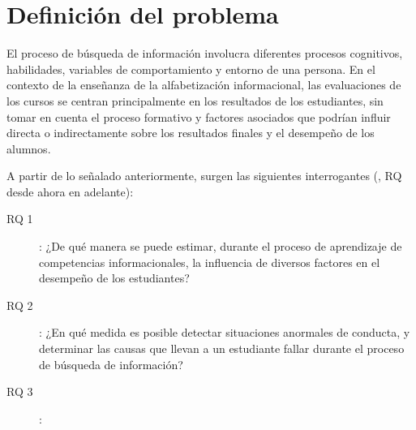 \section{Definición del problema}
\label{sec:definicion_problema}
El proceso de búsqueda de información involucra diferentes procesos cognitivos, habilidades, variables de comportamiento y entorno de una persona. En el contexto de la enseñanza de la alfabetización informacional, las evaluaciones de los cursos se centran principalmente en los resultados de los estudiantes, sin tomar en cuenta el proceso formativo y factores asociados que podrían influir directa o indirectamente sobre los resultados finales y el desempeño de los alumnos.  

A partir de lo señalado anteriormente, surgen las siguientes interrogantes (, RQ desde ahora en adelante):

\begin{description}
	\item [RQ 1]: ¿De qué manera se puede estimar, durante el proceso de aprendizaje de competencias informacionales, la influencia de diversos factores en el desempeño de los estudiantes?
	\item [RQ 2]: ¿En qué medida es posible detectar situaciones anormales de conducta, y determinar las causas que llevan a un estudiante fallar durante el proceso de búsqueda de información? 
	\item [RQ 3]:
\end{description}
